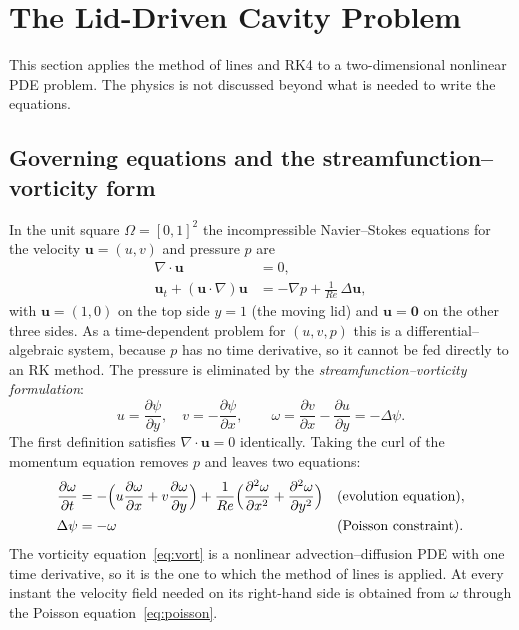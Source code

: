 \documentclass[11pt,a4paper]{article}
\begin{document}
\section{The Lid-Driven Cavity Problem}\label{sec:cavity}

This section applies the method of lines and RK4 to a two-dimensional nonlinear PDE problem. The
physics is not discussed beyond what is needed to write the equations.

\subsection{Governing equations and the streamfunction--vorticity form}

In the unit square $\Omega=[0,1]^2$ the incompressible Navier--Stokes equations for the velocity
$\mathbf u=(u,v)$ and pressure $p$ are
\begin{align}
\nabla\cdot\mathbf u&=0,\\
\mathbf u_t+(\mathbf u\cdot\nabla)\mathbf u&=-\nabla p+\frac1{Re}\,\Delta\mathbf u,
\end{align}
with $\mathbf u=(1,0)$ on the top side $y=1$ (the moving lid) and $\mathbf u=\mathbf 0$ on the other three
sides. As a time-dependent problem for $(u,v,p)$ this is a differential--algebraic system, because $p$
has no time derivative, so it cannot be fed directly to an RK method. The pressure is eliminated by the
\emph{streamfunction--vorticity formulation}:
\begin{equation}
u=\frac{\partial\psi}{\partial y},\quad v=-\frac{\partial\psi}{\partial x},\qquad
\omega=\frac{\partial v}{\partial x}-\frac{\partial u}{\partial y}=-\Delta\psi .
\end{equation}
The first definition satisfies $\nabla\cdot\mathbf u=0$ identically. Taking the curl of the momentum
equation removes $p$ and leaves two equations:
\begin{align}
\frac{\partial\omega}{\partial t}&=-\Bigl(u\frac{\partial\omega}{\partial x}+v\frac{\partial\omega}{\partial y}\Bigr)
+\frac1{Re}\Bigl(\frac{\partial^2\omega}{\partial x^2}+\frac{\partial^2\omega}{\partial y^2}\Bigr)
&&\text{(evolution equation)},\label{eq:vort}\\
\Delta\psi&=-\omega &&\text{(Poisson constraint)}.\label{eq:poisson}
\end{align}
The vorticity equation~\eqref{eq:vort} is a nonlinear advection--diffusion PDE with one time derivative,
so it is the one to which the method of lines is applied. At every instant the velocity field needed on
its right-hand side is obtained from $\omega$ through the Poisson equation~\eqref{eq:poisson}.
\end{document}
